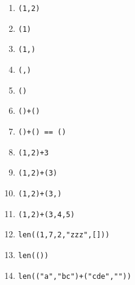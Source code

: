 \exer{}
\setcounter{numques}{0}



  \begin{enumerate}[label=\emph{\alph*)}]
    \item \texttt{(1,2)}
    \item \texttt{(1)}
    \item \texttt{(1,)}
    \item \texttt{(,)}
    \item \texttt{()}
    \item \texttt{()+()}
    \item \texttt{()+() == ()}
    \item \texttt{(1,2)+3}
    \item \texttt{(1,2)+(3)}
    \item \texttt{(1,2)+(3,)}
    \item \texttt{(1,2)+(3,4,5)}
    \item \texttt{len((1,7,2,"zzz",[]))}
    \item \texttt{len(())}
    \item \texttt{len(("a","bc")+("cde",""))}
  \end{enumerate}


